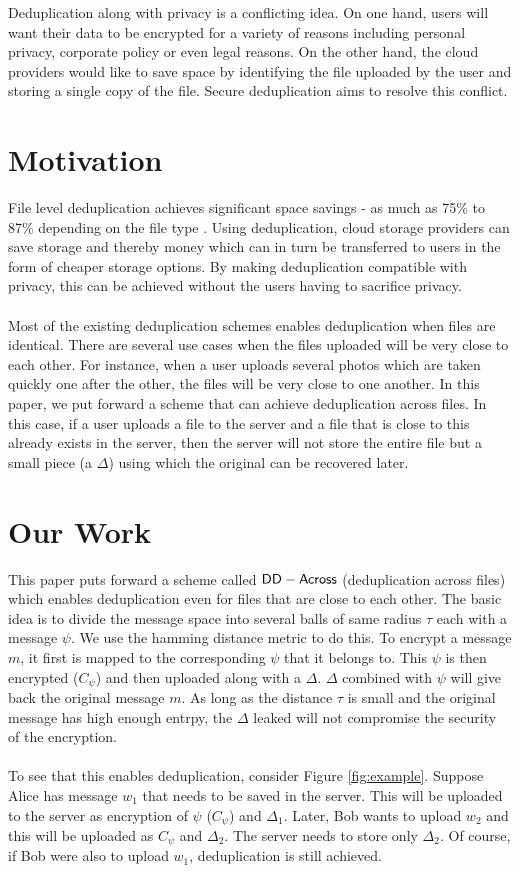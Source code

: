 Deduplication along with privacy is a conflicting idea. On one hand, users will want
their data to be encrypted for a variety of reasons including personal privacy, corporate policy or
even legal reasons. On the other hand, 
the cloud providers would like to save space by identifying the file uploaded by 
the user and storing a single copy of the file.
Secure deduplication aims to resolve this conflict.	

\section{Motivation}
File level deduplication achieves significant space savings - as much as 75\% to 87\% depending 
on the file type \cite{practicaldedup}. Using deduplication,
cloud storage providers can save storage and thereby money which can in turn be transferred to
users in the form of cheaper storage options. By making deduplication compatible with privacy,
this can be achieved without the users having to sacrifice privacy.
\\ \\
Most of the existing deduplication schemes enables deduplication when files are identical. There
are several use cases when the files uploaded will be very close to each other. For instance, 
when a user uploads several photos which are taken quickly one after the other, the files
will be very close to one another. In this
paper, we put forward a scheme that can achieve deduplication across files. In this case, if a user
uploads a file to the server and a file that is close to this already exists in the server,
then the server will not store the entire file but a small piece (a $\Delta$) 
using which the original can be recovered later.


\section{Our Work}
\label{sec:intro}
This paper puts forward a scheme called $\mathsf{DD-Across}$ (deduplication across files) which enables deduplication even for files that are close to
each other. The basic idea is to divide the message space into several balls of same radius $\tau$
each with a message $\psi$. We use the hamming distance metric to do this. To encrypt a 
message $m$, it first is mapped to the corresponding $\psi$ that it belongs to. This $\psi$ is then
encrypted ($C_\psi$) and then uploaded along with a $\Delta$. $\Delta$ combined with $\psi$ will give
back the original message $m$. As long as the distance $\tau$ is small and the original
message has high enough entrpy, the $\Delta$ leaked will not compromise the security of the
encryption.\\ \\
To see that this enables deduplication, consider Figure \ref{fig:example}. Suppose Alice has
message $w_1$ that needs to be saved in the server. This will be uploaded to the server 
as encryption of $\psi$ ($C_\psi$) and $\Delta_1$. Later, Bob wants to upload $w_2$ and this
will be uploaded as $C_\psi$ and $\Delta_2$. The server needs to store only $\Delta_2$. Of course,
if Bob were also to upload $w_1$, deduplication is still achieved.

